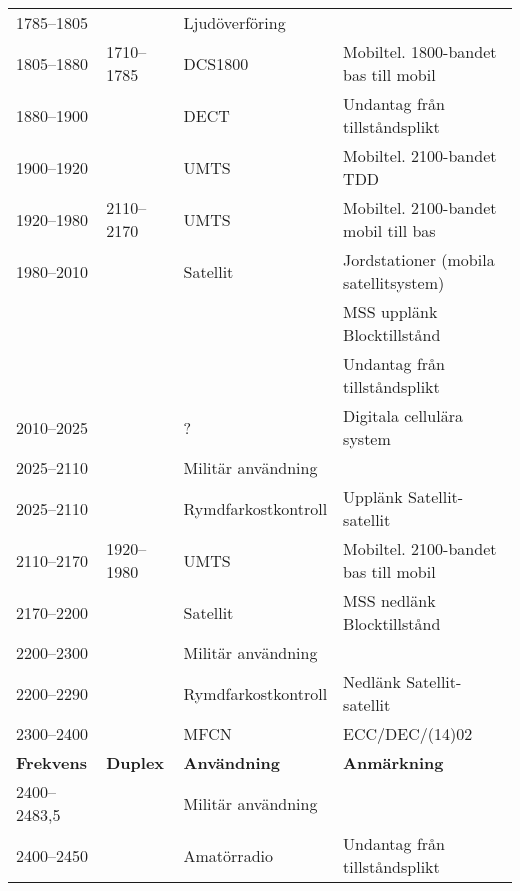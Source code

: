 \documentclass[10pt,swedish,a4paper,twoside]{article}
\begin{document}
\begin{landscape}
\begin{longtable}{llll}
	1785--1805         &                    & Ljudöverföring          &  \\
	1805--1880         & 1710--1785         & DCS1800                 & Mobiltel. 1800-bandet bas till mobil     \\
	1880--1900         &                    & DECT                    & Undantag från tillståndsplikt            \\
	1900--1920         &                    & UMTS                    & Mobiltel. 2100-bandet TDD                \\
	1920--1980         & 2110--2170         & UMTS                    & Mobiltel. 2100-bandet mobil till bas     \\
	1980--2010         &                    & Satellit                & Jordstationer (mobila satellitsystem)    \\
	                   &                    &                         & MSS upplänk Blocktillstånd               \\
	                   &                    &                         & Undantag från tillståndsplikt            \\
	2010--2025         &                    & ?                       & Digitala cellulära system                \\
	2025--2110         &                    & Militär användning      &  \\
	2025--2110         &                    & Rymdfarkostkontroll     & Upplänk Satellit-satellit                \\
	2110--2170         & 1920--1980         & UMTS                    & Mobiltel. 2100-bandet bas till mobil \\
	2170--2200         &                    & Satellit                & MSS nedlänk Blocktillstånd               \\
	2200--2300         &                    & Militär användning      &  \\
	2200--2290         &                    & Rymdfarkostkontroll     & Nedlänk Satellit-satellit                \\
	2300--2400         &                    & MFCN                    & ECC/DEC/(14)02                           \\
	\textbf{Frekvens}  & \textbf{Duplex}    & \textbf{Användning}     & \textbf{Anmärkning}                      \\ \hline
	2400--2483,5       &                    & Militär användning      &  \\
	2400--2450         &                    & Amatörradio             & Undantag från tillståndsplikt            \\

\end{longtable}
\end{landscape}
\end{document}

